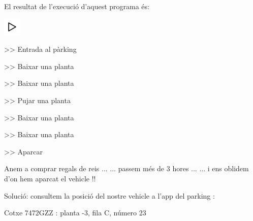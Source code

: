 \documentclass[]{book}
\newenvironment{Shaded}{\begin{snugshade}}{\end{snugshade}}
\newcommand{\DataTypeTok}[1]{\textcolor[rgb]{0.13,0.29,0.53}{#1}}
\newcommand{\DecValTok}[1]{\textcolor[rgb]{0.00,0.00,0.81}{#1}}
\newcommand{\SpecialCharTok}[1]{\textcolor[rgb]{0.00,0.00,0.00}{#1}}
\newcommand{\StringTok}[1]{\textcolor[rgb]{0.31,0.60,0.02}{#1}}
\newcommand{\CommentTok}[1]{\textcolor[rgb]{0.56,0.35,0.01}{\textit{#1}}}
\newcommand{\ControlFlowTok}[1]{\textcolor[rgb]{0.13,0.29,0.53}{\textbf{#1}}}
\newcommand{\NormalTok}[1]{#1}
\begin{document}
\begin{Shaded}
\end{Shaded}

El resultat de l'execució d'aquest programa és:

\includegraphics{./img/play.png}

\begin{Shaded}
\begin{Highlighting}[]
\NormalTok{>> Entrada al pàrking }

\NormalTok{>> Baixar una planta}

\NormalTok{>> Baixar una planta}

\NormalTok{>> Pujar una planta}

\NormalTok{>> Baixar una planta}

\NormalTok{>> Baixar una planta}

\NormalTok{>> Aparcar}

\NormalTok{Anem a comprar regals de reis ...}
\NormalTok{... passem més de }\DecValTok{3}\NormalTok{ hores ...}
\NormalTok{... i ens oblidem d'on hem aparcat el vehicle !!}

\NormalTok{Solució: consultem la posició del nostre vehicle }
\NormalTok{a l'app del parking : }

\NormalTok{Cotxe 7472GZZ : planta -}\DecValTok{3}\NormalTok{, fila C, número }\DecValTok{23}
\end{Highlighting}
\end{Shaded}
\end{document}
